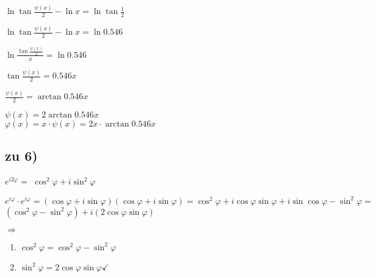 $\ln \tan \frac{\psi(x)}{2} - \ln x = \ln \tan \frac{1}{2}$

$\ln \tan \frac{\psi(x)}{2} - \ln x = \ln 0.546$

$\ln \frac{\tan \frac{\psi(x)}{2}}{x} = \ln 0.546$ 

$\tan \frac{\psi(x)}{2} = 0.546 x$

$ \frac{\psi(x)}{2} = \arctan 0.546 x$

$\psi(x) = 2 \arctan 0.546 x$\\

$\varphi(x) = x\cdot \psi(x) = 2x\cdot \arctan 0.546 x$

\subsection{zu 6)}
$e^{i2\varphi} = $
\underline{$ \cos^2 \varphi + i \sin^2 \varphi $}

$
e^{i\varphi} \cdot e^{i\varphi} 
= (\cos \varphi + i \sin \varphi)(\cos \varphi + i \sin \varphi)
= \cos^2 \varphi + i \cos \varphi \sin  \varphi + i \sin \cos \varphi - \sin^2 \varphi
= $
\underline{$(\cos^2 \varphi - \sin^2 \varphi) + i(2\cos \varphi \sin \varphi)$}

$\Rightarrow$
\begin{enumerate}
\item $ \cos^2 \varphi = \cos^2 \varphi - \sin^2 \varphi$
\item $ \sin^2 \varphi = 2 \cos \varphi \sin \varphi \checkmark$
\end{enumerate}
